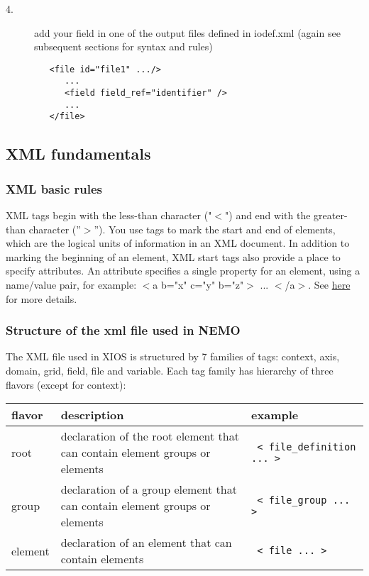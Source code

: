 \documentclass[NEMO_book]{subfiles}
\begin{document}
\begin{description}
\item[4.] add your field in one of the output files defined in iodef.xml (again see subsequent sections for syntax and rules)   \\
\vspace{-20pt}
\begin{alltt}  {{\scriptsize
\begin{verbatim}
   <file id="file1" .../>   
      ...
      <field field_ref="identifier" />   
      ...
   </file>   
\end{verbatim}
}}\end{alltt} 

\end{description}
\subsection{XML fundamentals}

\subsubsection{ XML basic rules}

XML tags begin with the less-than character ("$<$") and end with the greater-than character (''$>$''). 
You use tags to mark the start and end of elements, which are the logical units of information 
in an XML document. In addition to marking the beginning of an element, XML start tags also 
provide a place to specify attributes. An attribute specifies a single property for an element, 
using a name/value pair, for example: $<$a b="x" c="y" b="z"$>$ ... $<$/a$>$.
See \href{http://www.xmlnews.org/docs/xml-basics.html}{here} for more details.

\subsubsection{Structure of the xml file used in NEMO}

The XML file used in XIOS is structured by 7 families of tags: context, axis, domain, grid, field, file and variable. Each tag family has hierarchy of three flavors (except for context):
\\
\begin{tabular}{|p{3.0cm}|p{4.5cm}|p{4.5cm}|}
   \hline
   flavor &
   description &
   example \\
   \hline
   \hline
   root &
   declaration of the root element that can contain element groups or elements &
   {\scriptsize \verb? < file_definition ... >?} \\
   \hline
   group &
   declaration of a group element that can contain element groups or elements &
   {\scriptsize \verb? < file_group ... >?} \\
   \hline
   element &
   declaration of an element that can contain elements &
   {\scriptsize \verb? < file ... >?} \\
   \hline
\end{tabular}
\\
\end{document}

